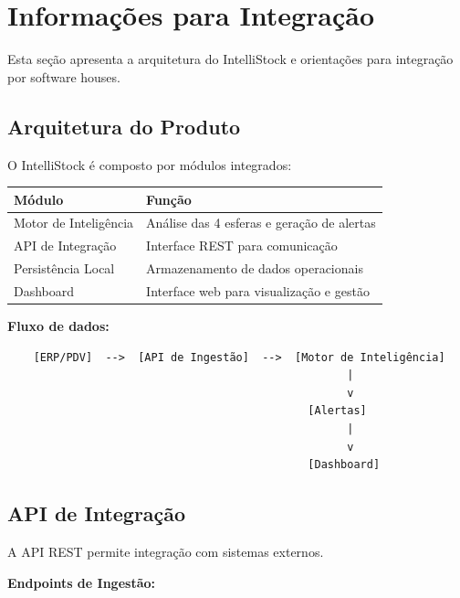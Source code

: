 
\section{Informações para Integração}

Esta seção apresenta a arquitetura do IntelliStock e orientações para
integração por software houses.

\subsection{Arquitetura do Produto}

O IntelliStock é composto por módulos integrados:

\begin{center}
\begin{tabular}{l p{8cm}}
\toprule
\textbf{Módulo} & \textbf{Função} \\
\midrule
Motor de Inteligência & Análise das 4 esferas e geração de alertas \\
API de Integração     & Interface REST para comunicação \\
Persistência Local    & Armazenamento de dados operacionais \\
Dashboard             & Interface web para visualização e gestão \\
\bottomrule
\end{tabular}
\end{center}

\textbf{Fluxo de dados:}

\begin{verbatim}
    [ERP/PDV]  -->  [API de Ingestão]  -->  [Motor de Inteligência]
                                                    |
                                                    v
                                              [Alertas]
                                                    |
                                                    v
                                              [Dashboard]
\end{verbatim}

\subsection{API de Integração}

A API REST permite integração com sistemas externos.

\textbf{Endpoints de Ingestão:}

